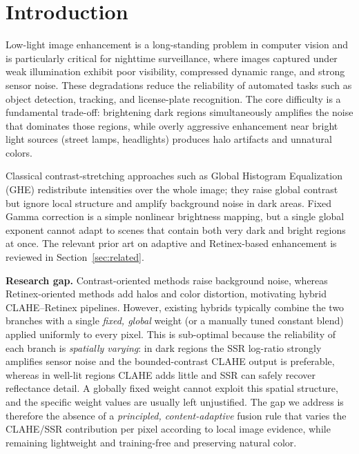 \documentclass[conference,a4paper]{IEEEtran}
\begin{document}
\section{Introduction}
Low-light image enhancement is a long-standing problem in computer vision and
is particularly critical for nighttime surveillance, where images captured
under weak illumination exhibit poor visibility, compressed dynamic range, and
strong sensor noise. These degradations reduce the reliability of automated
tasks such as object detection, tracking, and license-plate recognition. The
core difficulty is a fundamental trade-off: brightening dark regions
simultaneously amplifies the noise that dominates those regions, while overly
aggressive enhancement near bright light sources (street lamps, headlights)
produces halo artifacts and unnatural colors.

Classical contrast-stretching approaches such as Global Histogram Equalization
(GHE) redistribute intensities over the whole image; they raise global contrast
but ignore local structure and amplify background noise in dark areas. Fixed
Gamma correction is a simple nonlinear brightness mapping, but a single global
exponent cannot adapt to scenes that contain both very dark and bright regions
at once. The relevant prior art on adaptive and Retinex-based enhancement is
reviewed in Section~\ref{sec:related}.

\textbf{Research gap.} Contrast-oriented methods raise background noise, whereas
Retinex-oriented methods add halos and color distortion, motivating hybrid
CLAHE--Retinex pipelines. However, existing hybrids typically combine the two
branches with a single \emph{fixed, global} weight (or a manually tuned constant
blend) applied uniformly to every pixel. This is sub-optimal because the
reliability of each branch is \emph{spatially varying}: in dark regions the
SSR log-ratio strongly amplifies sensor noise and the bounded-contrast CLAHE
output is preferable, whereas in well-lit regions CLAHE adds little and SSR can
safely recover reflectance detail. A globally fixed weight cannot exploit this
spatial structure, and the specific weight values are usually left unjustified.
The gap we address is therefore the absence of a \emph{principled, content-adaptive}
fusion rule that varies the CLAHE/SSR contribution per pixel according to local
image evidence, while remaining lightweight and training-free and preserving
natural color.
\end{document}
